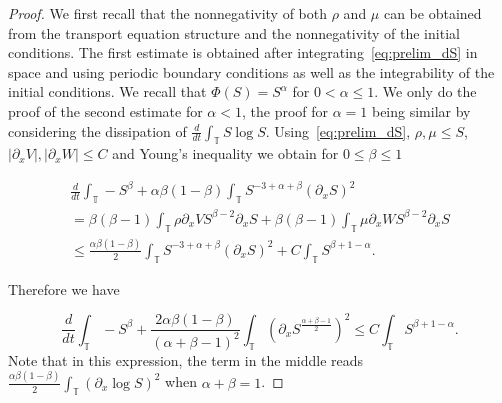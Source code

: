 \documentclass[10pt,a4paper]{amsart}
\newcommand {\T}  { {\mathbb{T}} }
\begin{document}
\begin{proof}
We first recall that the nonnegativity of both $\rho$ and $\mu$ can be obtained from the transport equation structure and the nonnegativity of the initial conditions. The first estimate is obtained after integrating~\eqref{eq:prelim_dS} in space and using periodic boundary conditions as well as the integrability of the initial conditions. 
We recall that $\Phi(S)= S^{\alpha}$ for $0< \alpha\le 1$. We only do the proof of the second estimate for $\alpha<1$, the proof for $\alpha=1$ being similar by considering the dissipation of $\frac{d}{dt}\int_{\T}S\log S$.
 Using~\eqref{eq:prelim_dS}, $\rho,\mu\le S$,  $|\partial_x V|, |\partial_x W|\le C$ and Young's inequality we obtain for $0\le \beta\le  1$

\begin{multline*}
\frac{d}{dt}\int_{\T}-S^{\beta}  + \alpha\beta(1-\beta)\int_{\T}S^{-3+\alpha+\beta}(\partial_x S)^2 \\= \beta(\beta-1)\int_{\T}\rho\partial_x V S^{\beta-2}\partial_xS+ \beta(\beta-1)\int_{\T}\mu\partial_x W S^{\beta-2}\partial_xS\\
\le \frac{\alpha\beta(1-\beta)}{2}\int_{\T}S^{-3+\alpha+\beta}(\partial_x S)^2 + C \int_{\T}S^{\beta+1-\alpha}.
\end{multline*}

Therefore we have

\begin{equation*}
\frac{d}{dt}\int_{\T}-S^{\beta} + \frac{2\alpha\beta(1-\beta)}{(\alpha+\beta-1)^2}\int_{\T}\left(\partial_x S^{\frac{\alpha+\beta-1}{2}}\right)^2 \le  C \int_{\T}S^{\beta+1-\alpha}.
\end{equation*}
Note that in this expression, the term in the middle reads $\frac{\alpha\beta(1-\beta)}{2}\int_\T \left(\partial_x \log S\right)^2$ when $\alpha+\beta=1$.


\end{proof}
\end{document}
